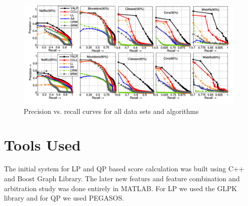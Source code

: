 \begin{figure}
\centering
\includegraphics[width=\textwidth,height=\textheight,keepaspectratio]{link_prediction/images/precision_recall.png}
\caption{Precision vs. recall curves for all data sets and algorithms}
\label{fig:precion_recall}
\end{figure}


\section*{Tools Used}
The initial system for LP and QP based score calculation was built using C++ and Boost Graph Library. The later new featurs and feature combination and arbitration study was done entirely in MATLAB. For LP we used the GLPK library and for QP we used PEGASOS.
